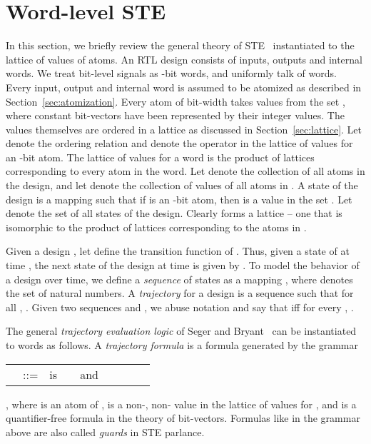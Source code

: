\documentclass{llncs}
\begin{document}
\section{Word-level STE}\label{sec:wste}
In this section, we briefly review the general theory of
STE~\cite{SegerBryant95} instantiated to the lattice of values of
atoms.  An RTL design  consists of inputs, outputs and internal
words.  We treat bit-level signals as -bit words, and uniformly
talk of words.  Every input, output and internal word is assumed to be
atomized as described in Section~\ref{sec:atomization}.  Every atom of
bit-width  takes values from the set , where constant bit-vectors have been
represented by their integer values.  The values themselves are
ordered in a lattice as discussed in Section~\ref{sec:lattice}.  Let
 denote the ordering relation and  denote the 
operator in the lattice of values for an -bit atom.  The lattice of
values for a word is the product of lattices corresponding to every
atom in the word.  Let  denote the collection of all
atoms in the design, and let  denote the collection
of values of all atoms in .  A state of the design
is a mapping  such that if
 is an -bit atom, then  is a value in the set
.  Let
 denote the set of all states of the design.  Clearly 
forms a lattice -- one that is isomorphic to the product of lattices
corresponding to the atoms in .  

Given a design , let  define
the transition function of .  Thus, given a state  of  at
time , the next state of the design at time  is given by
.  To model the behavior of a design over time, we define
a \emph{sequence} of states as a mapping , where  denotes the set of natural
numbers.  A \emph{trajectory} for a design  is a sequence 
such that for all , .  Given two sequences  and , we abuse
notation and say that  iff for every , .

The general \emph{trajectory evaluation logic} of Seger and
Bryant~\cite{SegerBryant95} can be instantiated to words as follows.
A \emph{trajectory formula} is a formula generated by the grammar
\begin{tabular}{lllllllll}
 & ::= &  is  &  &  and  & 
                   &  &   &
\end{tabular}, where
 is an atom of ,  is a non-,
non- value in the lattice of values for , and  is
a quantifier-free formula in the theory of bit-vectors.  Formulas like
 in the grammar above are also called \emph{guards} in STE
parlance.
\end{document}
